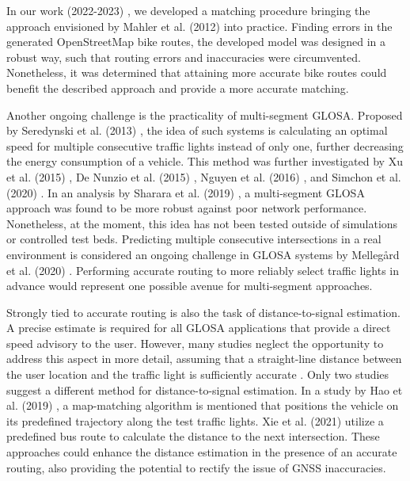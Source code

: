 In our work (2022-2023) \cite{matthes2022matching, matthes2023geo}, we developed a matching procedure bringing the approach envisioned by Mahler et al. (2012) \cite{mahler_reducing_2012} into practice. Finding errors in the generated OpenStreetMap bike routes, the developed model was designed in a robust way, such that routing errors and inaccuracies were circumvented. Nonetheless, it was determined that attaining more accurate bike routes could benefit the described approach and provide a more accurate matching.

Another ongoing challenge is the practicality of multi-segment GLOSA. Proposed by Seredynski et al. (2013) \cite{seredynski_comparison_2013, seredynski_multi-segment_2013}, the idea of such systems is calculating an optimal speed for multiple consecutive traffic lights instead of only one, further decreasing the energy consumption of a vehicle. This method was further investigated by Xu et al. (2015) \cite{xu_bb_2015}, De Nunzio et al. (2015) \cite{de_nunzio_eco-driving_2015}, Nguyen et al. (2016) \cite{nguyen_efficient_2016}, and Simchon et al. (2020) \cite{simchon_real-time_2020}. In an analysis by Sharara et al. (2019) \cite{sharara_impact_2019}, a multi-segment GLOSA approach was found to be more robust against poor network performance. Nonetheless, at the moment, this idea has not been tested outside of simulations or controlled test beds. Predicting multiple consecutive intersections in a real environment is considered an ongoing challenge in GLOSA systems by Mellegård et al. (2020) \cite{mellegard_day_2020}. Performing accurate routing to more reliably select traffic lights in advance would represent one possible avenue for multi-segment approaches.

Strongly tied to accurate routing is also the task of distance-to-signal estimation. A precise estimate is required for all GLOSA applications that provide a direct speed advisory to the user. However, many studies neglect the opportunity to address this aspect in more detail, assuming that a straight-line distance between the user location and the traffic light is sufficiently accurate \cite{iglesias_i2v_2008, katsaros_performance_2011, koukoumidis_signalguru_2011, koukoumidis_leveraging_2012, krause_traffic_2012, li_open_2012, stevanovic_green_2013, stevanovic_comparative_2014, eckhoff_potentials_2013, gajananan_cooperative_2013, tal_vehicular-communications-based_2016, bernais_design_2016, stebbins_characterising_2017, sharara_impact_2019}. Only two studies suggest a different method for distance-to-signal estimation. In a study by Hao et al. (2019) \cite{hao_eco-approach_2019}, a map-matching algorithm is mentioned that positions the vehicle on its predefined trajectory along the test traffic lights. Xie et al. (2021) \cite{xie_dynamic_2021} utilize a predefined bus route to calculate the distance to the next intersection. These approaches could enhance the distance estimation in the presence of an accurate routing, also providing the potential to rectify the issue of GNSS inaccuracies.


